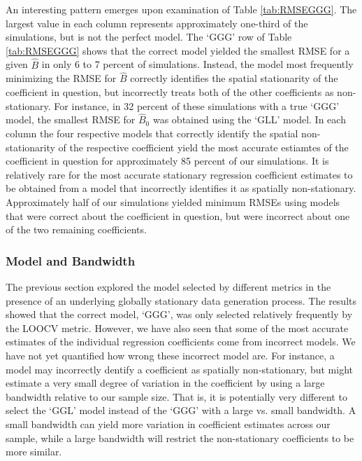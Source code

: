 \documentclass{article}\usepackage[]{graphicx}\usepackage[]{color}
\begin{document}
An interesting pattern emerges upon examination of Table \ref{tab:RMSEGGG}. The largest value in each column represents approximately one-third of the simulations, but is not the perfect model. The `GGG' row of Table \ref{tab:RMSEGGG} shows that the correct model yielded the smallest RMSE for a given $\widehat{B}$ in only 6 to 7 percent of simulations.  Instead, the model most frequently minimizing the RMSE for $\widehat{B}$ correctly identifies the spatial stationarity of the coefficient in question, but incorrectly treats both of the other coefficients as non-stationary. For instance, in 32 percent of these simulations with a true `GGG' model, the smallest RMSE for $\widehat{B}_0$ was obtained using the `GLL' model. In each column the four respective models that correctly identify the spatial non-stationarity of the respective coefficient yield the most accurate estiamtes of the coefficient in question for approximately 85 percent of our simulations. It is relatively rare for the most accurate stationary regression coefficient estimates to be obtained from a model that incorrectly identifies it as spatially non-stationary. Approximately half of our simulations yielded minimum RMSEs using models that were correct about the coefficient in question, but were incorrect about one of the two remaining coefficients.

\subsubsection{Model and Bandwidth}

The previous section explored the model selected by different metrics in the presence of an underlying globally stationary data generation process. The results showed that the correct model, `GGG', was only selected relatively frequently by the LOOCV metric. However, we have also seen that some of the most accurate estimates of the individual regression coefficients come from incorrect models. We have not yet quantified how wrong these incorrect model are. For instance, a model may incorrectly dentify a coefficient as spatially non-stationary, but might estimate a very small degree of variation in the coefficient by using a large bandwidth relative to our sample size. That is, it is potentially very different to select the `GGL' model instead of the `GGG' with a large vs. small bandwidth. A small bandwidth can yield more variation in coefficient estimates across our sample, while a large bandwidth will restrict the non-stationary coefficients to be more similar.
\end{document}

